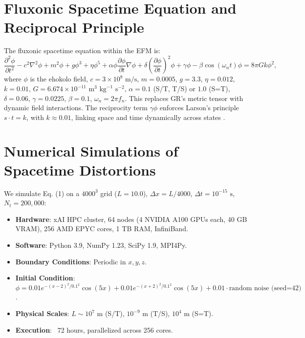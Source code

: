\documentclass[11pt]{article}
\begin{document}
\section{Fluxonic Spacetime Equation and Reciprocal Principle}
The fluxonic spacetime equation within the EFM is:
\begin{equation}
\frac{\partial^2 \phi}{\partial t^2} - c^2 \nabla^2 \phi + m^2 \phi + g \phi^3 + \eta \phi^5 + \alpha \phi \frac{\partial \phi}{\partial t} \nabla \phi + \delta \left(\frac{\partial \phi}{\partial t}\right)^2 \phi + \gamma \phi - \beta \cos(\omega_n t) \phi = 8 \pi G k \phi^2,
\end{equation}
where \(\phi\) is the ehokolo field, \(c = 3 \times 10^8 \text{ m/s}\), \(m = 0.0005\), \(g = 3.3\), \(\eta = 0.012\), \(k = 0.01\), \(G = 6.674 \times 10^{-11} \text{ m}^3 \text{ kg}^{-1} \text{ s}^{-2}\), \(\alpha = 0.1\) (S/T, T/S) or \(1.0\) (S=T), \(\delta = 0.06\), \(\gamma = 0.0225\), \(\beta = 0.1\), \(\omega_n = 2 \pi f_n\). This replaces GR’s metric tensor with dynamic field interactions. The reciprocity term \(\gamma \phi\) enforces Larson’s principle \( s \cdot t = k \), with \( k \approx 0.01 \), linking space and time dynamically across states \citep{emvula2025grand}.

\section{Numerical Simulations of Spacetime Distortions}
We simulate Eq. (1) on a \(4000^3\) grid (\(L = 10.0\)), \(\Delta x = L / 4000\), \(\Delta t = 10^{-15} \text{ s}\), \(N_t = 200,000\):
\begin{itemize}
    \item \textbf{Hardware}: xAI HPC cluster, 64 nodes (4 NVIDIA A100 GPUs each, 40 GB VRAM), 256 AMD EPYC cores, 1 TB RAM, InfiniBand.
    \item \textbf{Software}: Python 3.9, NumPy 1.23, SciPy 1.9, MPI4Py.
    \item \textbf{Boundary Conditions}: Periodic in \(x, y, z\).
    \item \textbf{Initial Condition}: \(\phi = 0.01 e^{-(x-2)^2/0.1^2} \cos(5x) + 0.01 e^{-(x+2)^2/0.1^2} \cos(5x) + 0.01 \cdot \text{random noise (seed=42)}\).
    \item \textbf{Physical Scales}: \(L \sim 10^7 \text{ m}\) (S/T), \(10^{-9} \text{ m}\) (T/S), \(10^4 \text{ m}\) (S=T).
    \item \textbf{Execution}: ~72 hours, parallelized across 256 cores.
\end{itemize}
\end{document}
